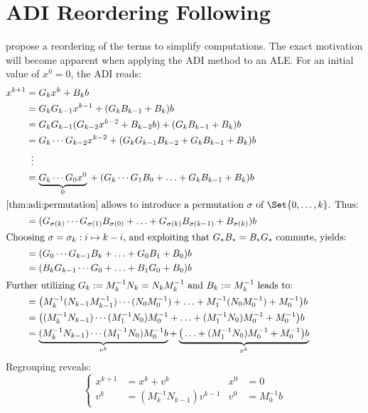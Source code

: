 \chapter{ADI Reordering Following \citeauthor{Li2002}}
\label{sec:li2002}

\citeauthor{Li2002} \cite{Li2002} propose a reordering of the terms to simplify computations.
The exact motivation will become apparent when applying the \ac{ADI} method to an \ac{ALE}.
For an initial value of $x^0 = 0$,
the \ac{ADI} reads:
\begin{align*}
  x^{k+1}
  &= G_k x^k + B_k b \\
  &= G_k G_{k-1} x^{k-1} + (G_k B_{k-1} + B_k) b \\
  &= G_k G_{k-1} (G_{k-2} x^{k-2} + B_{k-2}b) + (G_k B_{k-1} + B_k) b \\
  &= G_k \cdots G_{k-2} x^{k-2} + (G_k G_{k-1} B_{k-2} + G_k B_{k-1} + B_k) b \\
  &\vdotswithin{=} \\
  &= \underbrace{G_k \cdots G_0 x^0}_0 {} + (G_k \cdots G_1 B_0 + \ldots + G_k B_{k-1} + B_k) b \\
\intertext{%
  \autoref{thm:adi:permutation} allows to introduce a permutation $\sigma$ of $\Set{0,\ldots,k}$.
  Thus:
}
  &= (G_{\sigma(k)} \cdots G_{\sigma(1)} B_{\sigma(0)} + \ldots + G_{\sigma(k)} B_{\sigma(k-1)} + B_{\sigma(k)}) b \\
\intertext{%
  Choosing $\sigma = \sigma_k : i \mapsto k-i$,
  and exploiting that $G_* B_* = B_* G_*$ commute,
  yields:
}
  &= (G_0 \cdots G_{k-1} B_k + \ldots + G_0 B_1 + B_0) b \\
  &= (B_k G_{k-1} \cdots G_0 + \ldots + B_1 G_0 + B_0) b \\
\intertext{%
  Further utilizing $G_k := M_k^{-1} N_k = N_k M_k^{-1}$ and $B_k := M_k^{-1}$ leads to:
}
  &= \big( M_k^{-1} (N_{k-1} M_{k-1}^{-1}) \cdots (N_0 M_0^{-1}) + \ldots + M_1^{-1} (N_0 M_0^{-1}) + M_0^{-1} \big) b \\
  &= \big( (M_k^{-1} N_{k-1}) \cdots (M_1^{-1} N_0) M_0^{-1} + \ldots + (M_1^{-1} N_0) M_0^{-1} + M_0^{-1} \big) b \\
  &= \underbrace{
    (M_k^{-1} N_{k-1}) \cdots (M_1^{-1} N_0) M_0^{-1} b
  }_{v^k}
  + \underbrace{
    \big( \ldots + (M_1^{-1} N_0) M_0^{-1} + M_0^{-1} \big) b
  }_{x^k}
\end{align*}
Regrouping reveals:
\begin{equation*}
\left\{
\begin{aligned}
  x^{k+1} &= x^k + v^k &
  x^0 &= 0 \\
  v^k &= (M_k^{-1} N_{k-1}) v^{k-1} &
  v^0 &= M_0^{-1} b
\end{aligned}
\right.
\end{equation*}
